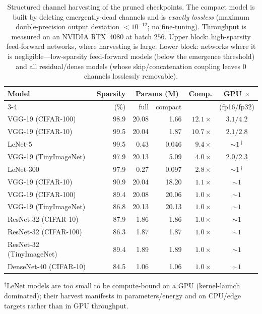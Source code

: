 \begin{table}[t]
  \centering
  \small
  \caption{Structured channel harvesting of the pruned checkpoints. The compact
    model is built by deleting emergently-dead channels and is \emph{exactly
    lossless} (maximum double-precision output deviation $<10^{-12}$; no
    fine-tuning). Throughput is measured on an NVIDIA RTX~4080 at batch $256$.
    Upper block: high-sparsity feed-forward networks, where harvesting is large.
    Lower block: networks where it is negligible---low-sparsity feed-forward
    models (below the emergence threshold) and all residual/dense models (whose
    skip/concatenation coupling leaves $0$ channels losslessly removable).}
  \label{tab:harvest}
  \begin{tabular}{l r r r r c}
    \toprule
    Model & Sparsity & \multicolumn{2}{c}{Params (M)} & Comp. & GPU $\times$ \\
    \cmidrule(lr){3-4}
          & (\%)     & full & compact & & (fp16/fp32) \\
    \midrule
    VGG-19 (CIFAR-100)   & 98.9 & 20.08 & 1.66  & $12.1\times$ & $3.1/4.2$ \\
    VGG-19 (CIFAR-10)    & 99.5 & 20.04 & 1.87  & $10.7\times$ & $2.1/2.8$ \\
    LeNet-5              & 99.5 & 0.43  & 0.046 & $9.4\times$  & $\sim\!1$\,$^{\dagger}$ \\
    VGG-19 (TinyImageNet)& 97.9 & 20.13 & 5.09  & $4.0\times$  & $2.0/2.3$ \\
    LeNet-300            & 97.9 & 0.27  & 0.097 & $2.8\times$  & $\sim\!1$\,$^{\dagger}$ \\
    \midrule
    VGG-19 (CIFAR-10)    & 90.9 & 20.04 & 18.20 & $1.1\times$  & $\sim\!1$ \\
    VGG-19 (CIFAR-100)   & 89.4 & 20.08 & 20.06 & $1.0\times$  & $\sim\!1$ \\
    VGG-19 (TinyImageNet)& 86.8 & 20.13 & 20.13 & $1.0\times$  & $\sim\!1$ \\
    ResNet-32 (CIFAR-10) & 87.9 & 1.86  & 1.86  & $1.0\times$  & $\sim\!1$ \\
    ResNet-32 (CIFAR-100)& 86.3 & 1.87  & 1.87  & $1.0\times$  & $\sim\!1$ \\
    ResNet-32 (TinyImageNet)& 89.4 & 1.89 & 1.89 & $1.0\times$ & $\sim\!1$ \\
    DenseNet-40 (CIFAR-10)& 84.5 & 1.06 & 1.06  & $1.0\times$  & $\sim\!1$ \\
    \bottomrule
  \end{tabular}

  \vspace{2pt}
  {\footnotesize $^{\dagger}$LeNet models are too small to be compute-bound on a
  GPU (kernel-launch dominated); their harvest manifests in
  parameters/energy and on CPU/edge targets rather than in GPU throughput.}
\end{table}
